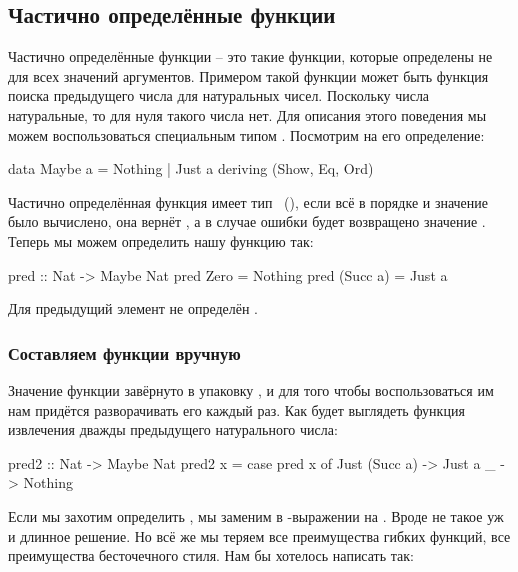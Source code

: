\subsection{Частично определённые функции}

Частично определённые функции -- это такие функции, которые определены
не для всех значений аргументов. Примером такой функции может быть
функция поиска предыдущего числа для натуральных чисел. Поскольку числа
натуральные, то для нуля такого числа нет. Для описания этого поведения
мы можем воспользоваться специальным типом
 . Посмотрим на
его определение:


\begin{code}
data Maybe a = Nothing | Just a
    deriving (Show, Eq, Ord)
\end{code}


Частично определённая функция имеет тип
~(), если всё в порядке и значение было
вычислено, она вернёт , а в случае ошибки будет возвращено
значение . Теперь мы можем определить нашу функцию так:


\begin{code}
pred :: Nat -> Maybe Nat
pred Zero       = Nothing
pred (Succ a)   = Just a
\end{code}

Для  предыдущий элемент не определён .

\subsubsection{Составляем функции вручную}

Значение функции  завёрнуто в упаковку , и для того
чтобы воспользоваться им нам придётся разворачивать его каждый раз. Как
будет выглядеть функция извлечения дважды предыдущего натурального
числа:


\begin{code}
pred2 :: Nat -> Maybe Nat
pred2 x = 
    case pred x of
        Just (Succ a) -> Just a
        _             -> Nothing
\end{code}

Если мы захотим определить , мы заменим  в
-выражении на . Вроде не такое уж и длинное решение.
Но всё же мы теряем все преимущества гибких функций, все преимущества
бесточечного стиля. Нам бы хотелось написать так:


